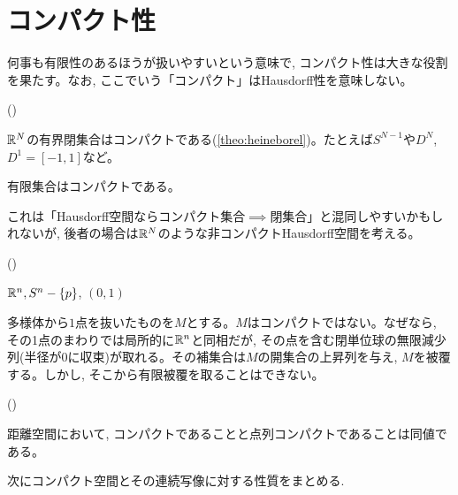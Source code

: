 \section{コンパクト性}
何事も有限性のあるほうが扱いやすいという意味で, コンパクト性は大きな役割を果たす。なお, ここでいう「コンパクト」はHausdorff性を意味しない。

\begin{eg} ()
\ben
\item $\mathbb{R}^N$の有界閉集合はコンパクトである(\ref{theo:heineborel})。たとえば$S^{N-1}$や$D^{N}$, $D^1 = [-1,1]$など。
\item 有限集合はコンパクトである。
\item {}
\item {}これは「Hausdorff空間ならコンパクト集合$\implies$閉集合」と混同しやすいかもしれないが, 後者の場合は$\mathbb{R}^{N}$のような非コンパクトHausdorff空間を考える。
\item
\een
\end{eg}

\begin{eg} ()
\ben
\item $\mathbb{R}^{n}, S^{n} - \{ p \}$, $(0,1)$
\item {}
\item 多様体から$1$点を抜いたものを$M$とする。$M$はコンパクトではない。なぜなら, その1点のまわりでは局所的に$\mathbb{R}^{n}$と同相だが, その点を含む閉単位球の無限減少列(半径が$0$に収束)が取れる。その補集合は$M$の開集合の上昇列を与え, $M$を被覆する。しかし, そこから有限被覆を取ることはできない。
\een
\end{eg}

\begin{theo}

\end{theo}

\begin{theo} ()\\
\ben
\item 距離空間において, コンパクトであることと点列コンパクトであることは同値である。
\item
\een
\end{theo}

次にコンパクト空間とその連続写像に対する性質をまとめる.

